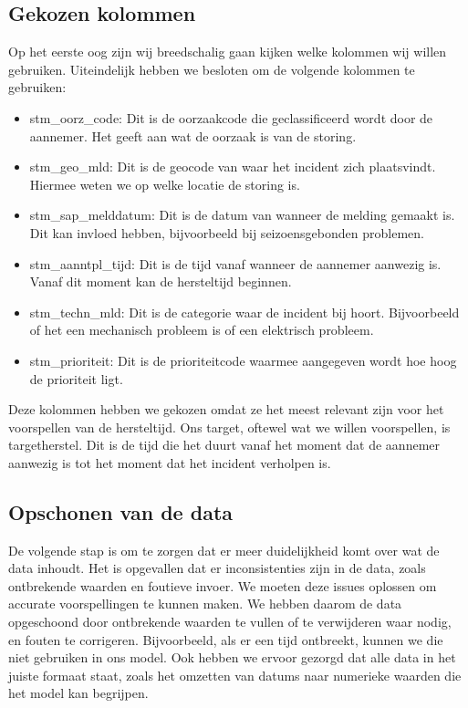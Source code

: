 \documentclass{article}
\begin{document}
\subsection{Gekozen kolommen}
Op het eerste oog zijn wij breedschalig gaan kijken welke kolommen wij willen gebruiken. Uiteindelijk hebben we besloten om de volgende kolommen te gebruiken:
\begin{itemize}
    \item stm\_oorz\_code: Dit is de oorzaakcode die geclassificeerd wordt door de aannemer. Het geeft aan wat de oorzaak is van de storing.
    \item stm\_geo\_mld: Dit is de geocode van waar het incident zich plaatsvindt. Hiermee weten we op welke locatie de storing is.
    \item stm\_sap\_melddatum: Dit is de datum van wanneer de melding gemaakt is. Dit kan invloed hebben, bijvoorbeeld bij seizoensgebonden problemen.
    \item stm\_aanntpl\_tijd: Dit is de tijd vanaf wanneer de aannemer aanwezig is. Vanaf dit moment kan de hersteltijd beginnen.
    \item stm\_techn\_mld: Dit is de categorie waar de incident bij hoort. Bijvoorbeeld of het een mechanisch probleem is of een elektrisch probleem.
    \item stm\_prioriteit: Dit is de prioriteitcode waarmee aangegeven wordt hoe hoog de prioriteit ligt.
\end{itemize}
Deze kolommen hebben we gekozen omdat ze het meest relevant zijn voor het voorspellen van de hersteltijd. Ons target, oftewel wat we willen voorspellen, is targetherstel. Dit is de tijd die het duurt vanaf het moment dat de aannemer aanwezig is tot het moment dat het incident verholpen is.

\subsection{Opschonen van de data}
De volgende stap is om te zorgen dat er meer duidelijkheid komt over wat de data inhoudt. Het is opgevallen dat er inconsistenties zijn in de data, zoals ontbrekende waarden en foutieve invoer. We moeten deze issues oplossen om accurate voorspellingen te kunnen maken. We hebben daarom de data opgeschoond door ontbrekende waarden te vullen of te verwijderen waar nodig, en fouten te corrigeren. Bijvoorbeeld, als er een tijd ontbreekt, kunnen we die niet gebruiken in ons model. Ook hebben we ervoor gezorgd dat alle data in het juiste formaat staat, zoals het omzetten van datums naar numerieke waarden die het model kan begrijpen.
\end{document}

